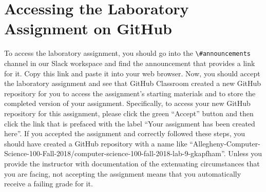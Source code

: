\documentclass[11pt]{article}
\newcommand{\command}[1]{``\lstinline{#1}''}
\newcommand{\channel}[1]{\lstinline{#1}}
\begin{document}
\section*{Accessing the Laboratory Assignment on GitHub}

To access the laboratory assignment, you should go into the
\channel{\#announcements} channel in our Slack workspace and find the
announcement that provides a link for it. Copy this link and paste it into your
web browser. Now, you should accept the laboratory assignment and see that
GitHub Classroom created a new GitHub repository for you to access the
assignment's starting materials and to store the completed version of your
assignment. Specifically, to access your new GitHub repository for this
assignment, please click the green ``Accept'' button and then click the link
that is prefaced with the label ``Your assignment has been created here''. If
you accepted the assignment and correctly followed these steps, you should have
created a GitHub repository with a name like
``Allegheny-Computer-Science-100-Fall-2018/computer-science-100-fall-2018-lab-9-gkapfham''.
Unless you provide the instructor with documentation of the extenuating
circumstances that you are facing, not accepting the assignment means that you
automatically receive a failing grade for it.


\end{document}
